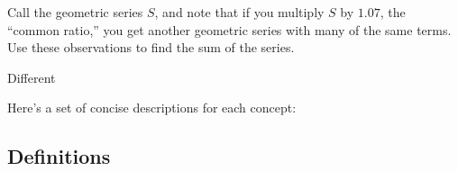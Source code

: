\documentclass[handout,space,nooutcomes]{ximera}
\begin{document}
\begin{question}
Call the geometric series $S$, and note that if you multiply $S$ by $1.07$, the ``common ratio,'' you get another geometric series with many of the same terms.  Use these observations to find the sum of the series.   
\begin{freeResponse}
\end{freeResponse}
\end{question}

Different 

%
%
%
%
%
%
%
%
%
%
%
%
%




Here’s a set of concise descriptions for each concept:
\subsection{Definitions}
\end{document}
